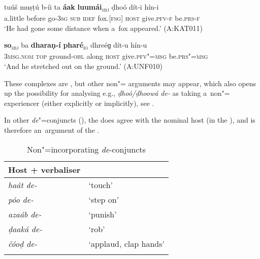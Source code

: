 \begin{exe}
\begin{exe}
\ex
\label{ex:12-92}
\gll tuúš muṣṭú b-íi ta {\ob}\textbf{áak} \textbf{luumái}{\cb}\textsubscript{\textsc{\upshape sbj}} ḍhoó dít-i hín-i\\
a.little before go-\textsc{3sg} \textsc{sub} \textsc{idef} fox.[\textsc{fsg]} \textsc{host} give.\textsc{pfv-f} be.\textsc{prs-f}\\
\glt `He had gone some distance when a~fox appeared.' (A:KAT011)
\end{exe}
\begin{exe}
\ex
\label{ex:12-93}
\gll {\ob}\textbf{so}{\cb}\textsubscript{\textsc{\upshape sbj}} ba {\ob}\textbf{dharaṇ-í} \textbf{pharé}{\cb}\textsubscript{\textsc{\upshape io}} dhreéɡ dít-u hín-u\\
\textsc{3msg.nom} \textsc{top} ground-\textsc{obl} along \textsc{host} give.\textsc{pfv"=msg} be.\textsc{prs"=msg}\\
\glt `And he stretched out on the ground.' (A:UNF010)
\end{exe}

These complexes are , but other non"= arguments may appear, which also opens up the possibility for analysing e.g., \textit{ḍhoó/ḍhoowá de-} as taking a~non"= experiencer  (either explicitly or implicitly), see . 


 In other \textit{de}"=conjuncts (), the  does agree with the nominal host (in the ), and is therefore an~argument of the . 


\begin{table}[ht]
\caption{Non"=incorporating \textit{de}-conjuncts}
\begin{tabularx}{.75\textwidth}{ l@{\hspace{45pt}} Q }
\lspbottomrule
\textbf{Host + verbaliser} &
\\\midrule
\textit{haát de-} &
`touch'\\
\textit{póo de-} &
`step on'\\
\textit{azaáb de-} &
`punish'\\
\textit{ḍaaká de-} &
`rob'\\
\textit{čóoḍ de-} &
`applaud, clap hands'\\\lspbottomrule
\end{tabularx}
\label{tab:12-8}
\end{table}



\end{exe}
